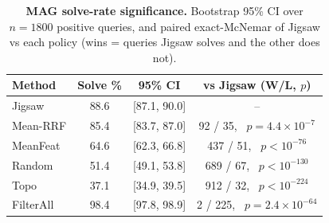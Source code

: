 \documentclass[runningheads]{llncs}
\begin{document}
\begin{table}[H]
\centering
\caption{\textbf{MAG solve-rate significance.} Bootstrap 95\% CI over $n{=}1800$ positive queries, and paired exact-McNemar of Jigsaw vs each policy (wins = queries Jigsaw solves and the other does not).}
\label{tab:significance}
\small
\setlength{\tabcolsep}{6pt}
\begin{tabular}{lccc}
\toprule
\textbf{Method} & \textbf{Solve \%} & \textbf{95\% CI} & \textbf{vs Jigsaw (W/L, $p$)} \\
\midrule
Jigsaw    & 88.6 & [87.1, 90.0] & -- \\
Mean-RRF  & 85.4 & [83.7, 87.0] & 92 / 35, \ $p{=}4.4{\times}10^{-7}$ \\
MeanFeat  & 64.6 & [62.3, 66.8] & 437 / 51, \ $p{<}10^{-76}$ \\
Random    & 51.4 & [49.1, 53.8] & 689 / 67, \ $p{<}10^{-130}$ \\
Topo      & 37.1 & [34.9, 39.5] & 912 / 32, \ $p{<}10^{-224}$ \\
FilterAll & 98.4 & [97.8, 98.9] & 2 / 225, \ $p{=}2.4{\times}10^{-64}$ \\
\bottomrule
\end{tabular}
\end{table}

\begin{table}[H]
\centering
\caption{\textbf{Jigsaw query-family breakdown.} Positive columns report exact-solve rate; negative columns report correct no-match rate. All three datasets use the corrected connected multi-family reruns (the MAG connected refresh is now merged into the canonical grid). All datasets are reported at the matched half-partition budget ($K{=}10/100/1000$); the MAG rows use the deployed MAG encoder (overall $88.6\%$).}
\label{tab:jigsaw_family}
\scriptsize
\setlength{\tabcolsep}{3pt}
\end{table}
\end{document}
